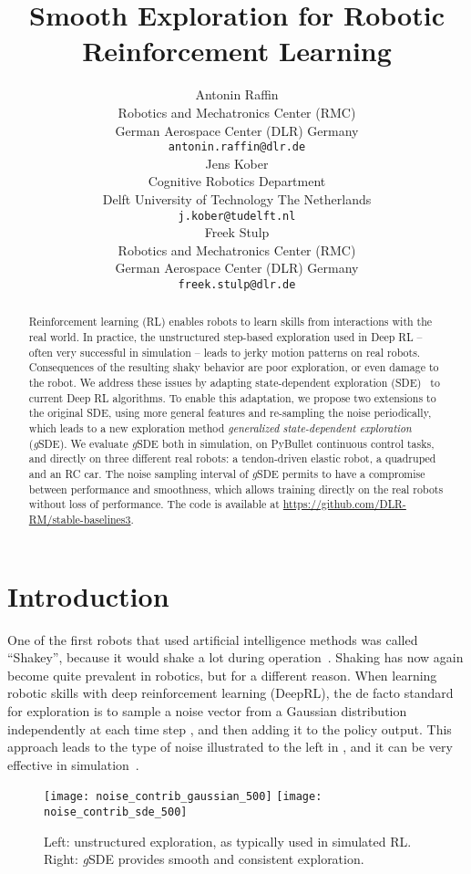 \documentclass{article}
\title{Smooth Exploration for Robotic Reinforcement Learning}
\author{
  Antonin Raffin\\
  Robotics and Mechatronics Center (RMC)\\
  German Aerospace Center (DLR)
  Germany\\
  \texttt{antonin.raffin@dlr.de} \\
  \And
  Jens Kober\\
  Cognitive Robotics Department\\
  Delft University of Technology
  The Netherlands\\
  \texttt{j.kober@tudelft.nl} \\
  \And
  Freek Stulp\\
  Robotics and Mechatronics Center (RMC)\\
  German Aerospace Center (DLR)
  Germany\\
  \texttt{freek.stulp@dlr.de} \\
}
\newcommand{\ourSDE}{\textit{g}\textsc{SDE}\xspace}
\begin{document}
\maketitle


\begin{abstract}

Reinforcement learning (RL) enables robots to learn skills from interactions with the real world.
In practice, the unstructured step-based exploration used in Deep RL -- often very successful in simulation -- leads to jerky motion patterns on real robots.
Consequences of the resulting shaky behavior are poor exploration, or even damage to the robot.
We address these issues by adapting state-dependent exploration (SDE)~\citep{ruckstiess2008state} to current Deep RL algorithms.
To enable this adaptation, we propose two extensions to the original SDE, using more general features and re-sampling the noise periodically, which leads to a new exploration method \textit{generalized state-dependent exploration} (\ourSDE).
We evaluate \ourSDE both in simulation, on PyBullet continuous control tasks, and directly on three different real robots: a tendon-driven elastic robot, a quadruped and an RC car.
The noise sampling interval of \ourSDE permits to have a compromise between performance and smoothness, which allows training directly on the real robots without loss of performance.
The code is available at \url{https://github.com/DLR-RM/stable-baselines3}.
\end{abstract}



\section{Introduction}
\label{sec:intro}

One of the first robots that used artificial intelligence methods was called ``Shakey'', because it would shake a lot during operation~\citep{nilsson84shakey}.
Shaking has now again become quite prevalent in robotics, but for a different reason. When learning robotic skills with deep reinforcement learning (DeepRL), the de facto standard for exploration is to sample a noise vector  from a Gaussian distribution independently at each time step , and then adding it to the policy output.
This approach leads to the type of noise illustrated to the left in , and it can be very effective
in simulation~\citep{duan2016benchmarking, andrychowicz2018learning, fujimoto2018addressing, peng2018deepmimic, hwangbo2019learning}.
\begin{figure}[htb]
  \centering
  \texttt{[image: noise\_contrib\_gaussian\_500]}
  \hfill
  \texttt{[image: noise\_contrib\_sde\_500]}
  \caption{\label{fig:exploration_comparison} Left: unstructured exploration, as typically used in simulated RL. Right: \ourSDE provides smooth and consistent exploration.}
\end{figure}
\end{document}
